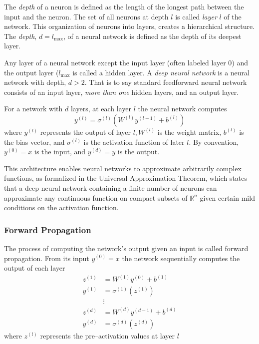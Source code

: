             The \emph{depth} of a neuron is defined as the length of the longest path between the input and the neuron.
            The set of all neurons at depth \(l\) is called \emph{layer} \(l\) of the network.
            This organization of neurons into layers, creates a hierarchical structure.
            The \emph{depth}, \(d = l_{\max}\), of a neural network is defined as the depth of its deepest layer.

            Any layer of a neural network except the input layer (often labeled layer \(0\)) and the output layer (\(l_{\max}\) is called a hidden layer.
            A \emph{deep neural network} is a neural network with depth, \(d > 2\).
            That is to say standard feedforward neural network consists of an input layer, \emph{more than one} hidden layers, and an output layer.
            
            For a network with \(d\) layers, at each layer \(l\) the neural network computes
            \begin{equation}
                y^{(l)} = \sigma^{(l)}(W^{(l)} y^{(l-1)} + b^{(l)})
            \end{equation}
            where \(y^{(l)}\) represents the output of layer \(l, W^{(l)}\) is the weight matrix, \(b^{(l)}\) is the bias vector, and \(\sigma^{(l)}\) is the activation function of later \(l\).
            By convention, \(y^{(0)} = x\) is the input, and \(y^{(d)} = y\) is the output.

            This architecture enables neural networks to approximate arbitrarily complex functions, as formalized in the Universal Approximation Theorem, which states that a deep neural network containing a finite number of neurons can approximate any continuous function on compact subsets of \(\mathbb{R}^n\) given certain mild conditions on the activation function.

        
        \subsubsection{Forward Propagation}
            The process of computing the network's output given an input is called forward propagation.
            From its input \(y^{(0)} = x\) the network sequentially computes the output of each layer
            \begin{align}
                z^{(1)} &= W^{(1)}y^{(0)} + b^{(1)} \\
                y^{(1)} &= \sigma^{(1)}(z^{(1)}) \\
                &\nonumber \vdots \\
                z^{(d)} &= W^{(d)}y^{(d-1)} + b^{(d)} \\
                y^{(d)} &= \sigma^{(d)}(z^{(d)})
            \end{align}
            where \(z^{(l)}\) represents the pre--activation values at layer \(l\)
